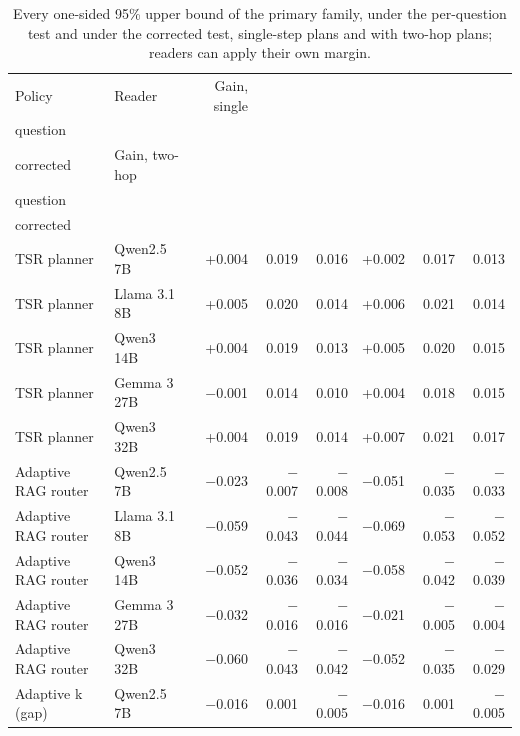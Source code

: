 \begin{table}[t]
\centering\small
\setlength{\tabcolsep}{4pt}
\caption{Every one-sided 95\% upper bound of the primary family, under the per-question test and under the corrected test, single-step plans and with two-hop plans; readers can apply their own margin.}
\label{tab:extra_bounds}
\begin{tabular*}{\linewidth}{@{\extracolsep{\fill}}llrrrrrr}
\toprule
Policy & Reader & Gain, single & \begin{tabular}[b]{@{}r@{}}Bound, per \\ question\end{tabular} & \begin{tabular}[b]{@{}r@{}}Bound, \\ corrected\end{tabular} & Gain, two-hop & \begin{tabular}[b]{@{}r@{}}Bound, per \\ question \end{tabular} & \begin{tabular}[b]{@{}r@{}}Bound, \\ corrected \end{tabular} \\
\midrule
TSR planner & Qwen2.5 7B & +0.004 & 0.019 & 0.016 & +0.002 & 0.017 & 0.013 \\
TSR planner & Llama 3.1 8B & +0.005 & 0.020 & 0.014 & +0.006 & 0.021 & 0.014 \\
TSR planner & Qwen3 14B & +0.004 & 0.019 & 0.013 & +0.005 & 0.020 & 0.015 \\
TSR planner & Gemma 3 27B & $-$0.001 & 0.014 & 0.010 & +0.004 & 0.018 & 0.015 \\
TSR planner & Qwen3 32B & +0.004 & 0.019 & 0.014 & +0.007 & 0.021 & 0.017 \\
Adaptive RAG router & Qwen2.5 7B & $-$0.023 & $-$0.007 & $-$0.008 & $-$0.051 & $-$0.035 & $-$0.033 \\
Adaptive RAG router & Llama 3.1 8B & $-$0.059 & $-$0.043 & $-$0.044 & $-$0.069 & $-$0.053 & $-$0.052 \\
Adaptive RAG router & Qwen3 14B & $-$0.052 & $-$0.036 & $-$0.034 & $-$0.058 & $-$0.042 & $-$0.039 \\
Adaptive RAG router & Gemma 3 27B & $-$0.032 & $-$0.016 & $-$0.016 & $-$0.021 & $-$0.005 & $-$0.004 \\
Adaptive RAG router & Qwen3 32B & $-$0.060 & $-$0.043 & $-$0.042 & $-$0.052 & $-$0.035 & $-$0.029 \\
Adaptive k (gap) & Qwen2.5 7B & $-$0.016 & 0.001 & $-$0.005 & $-$0.016 & 0.001 & $-$0.005 \\

\end{tabular*}
\end{table}
